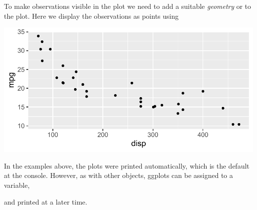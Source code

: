 \documentclass[krantz2]{krantz}\usepackage{knitr}
\begin{document}
To make observations visible in the plot we need to add a suitable \emph{geometry} or  to the plot. Here we display the observations as points using 

\begin{knitrout}\footnotesize
{}\color{fgcolor}\begin{kframe}
\begin{alltt}
\hlstd{(} 
       \hlstd{(}    \hlopt{+}
  \hlstd{()}
\end{alltt}
\end{kframe}

{\centering \includegraphics[width=.7\textwidth]{figure/pos-ggplot-basics-04-1}

}



\end{knitrout}

\begin{warningbox}
In the examples above, the plots were printed automatically, which is the default at the \Rlang console. However, as with other \Rlang objects, ggplots can be assigned to a variable,

\begin{knitrout}\footnotesize
{}\color{fgcolor}\begin{kframe}
\begin{alltt}
 \hlkwb{<-} \hlstd{(} 
            \hlstd{(}    \hlopt{+}
       \hlstd{()}
\end{alltt}
\end{kframe}
\end{knitrout}

and printed at a later time.

\begin{knitrout}\footnotesize
{}\color{fgcolor}\begin{kframe}
\begin{alltt}
\end{alltt}
\end{kframe}
\end{knitrout}
\end{warningbox}
\end{document}
